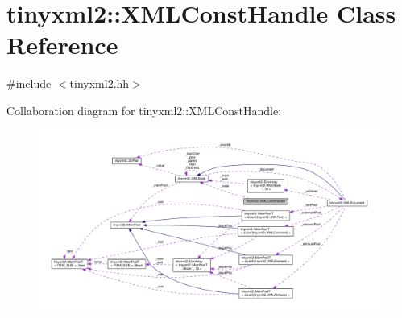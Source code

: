 \hypertarget{classtinyxml2_1_1XMLConstHandle}{}\section{tinyxml2\+:\+:X\+M\+L\+Const\+Handle Class Reference}
\label{classtinyxml2_1_1XMLConstHandle}


{\ttfamily \#include $<$tinyxml2.\+hh$>$}



Collaboration diagram for tinyxml2\+:\+:X\+M\+L\+Const\+Handle\+:
\nopagebreak
\begin{figure}[H]
\begin{center}
\leavevmode
\includegraphics[width=350pt]{classtinyxml2_1_1XMLConstHandle__coll__graph}
\end{center}
\end{figure}
